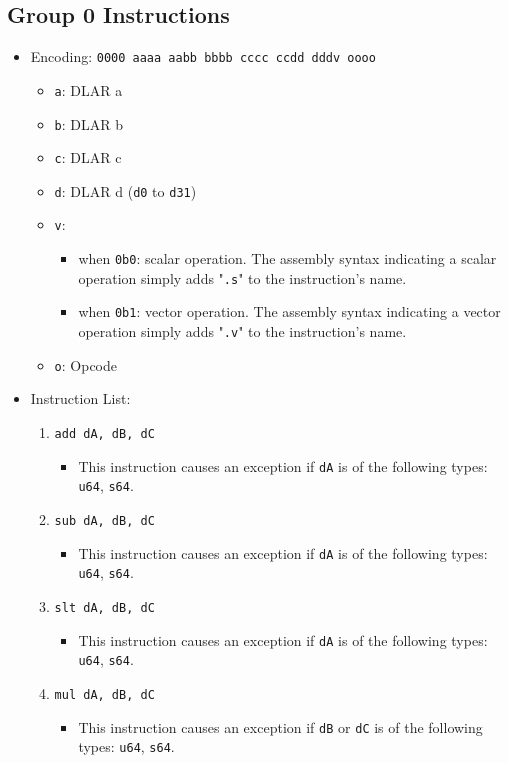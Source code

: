 \documentclass{article}
\begin{document}
	\subsection{Group 0 Instructions}
		\begin{itemize}
		\item Encoding: \texttt{0000 aaaa aabb bbbb  cccc ccdd dddv oooo}
			\begin{itemize}
			\item \texttt{a}: DLAR a
			\item \texttt{b}: DLAR b
			\item \texttt{c}: DLAR c
			\item \texttt{d}: DLAR d (\texttt{d0} to \texttt{d31})
			\item \texttt{v}:
				\begin{itemize}
				\item when \texttt{0b0}: scalar operation. The assembly
					syntax indicating a scalar operation simply adds
					"\texttt{.s}" to the instruction's name.
				\item when \texttt{0b1}: vector operation. The assembly
					syntax indicating a vector operation simply adds
					"\texttt{.v}" to the instruction's name.
				\end{itemize}
			\item \texttt{o}: Opcode
			\end{itemize}
		\item Instruction List:
			\begin{enumerate}
			\item \texttt{add dA, dB, dC}
				\begin{itemize}
				\item This instruction causes an exception if \texttt{dA}
					is of the following types: \texttt{u64}, \texttt{s64}.
				\end{itemize}
			\item \texttt{sub dA, dB, dC}
				\begin{itemize}
				\item This instruction causes an exception if \texttt{dA}
					is of the following types: \texttt{u64}, \texttt{s64}.
				\end{itemize}
			\item \texttt{slt dA, dB, dC}
				\begin{itemize}
				\item This instruction causes an exception if \texttt{dA}
					is of the following types: \texttt{u64}, \texttt{s64}.
				\end{itemize}
			\item \texttt{mul dA, dB, dC}
				\begin{itemize}
				\item This instruction causes an exception if \texttt{dB}
					or \texttt{dC} is of the following types: \texttt{u64},
					\texttt{s64}.
				\end{itemize}


\end{enumerate}
\end{itemize}
\end{document}
